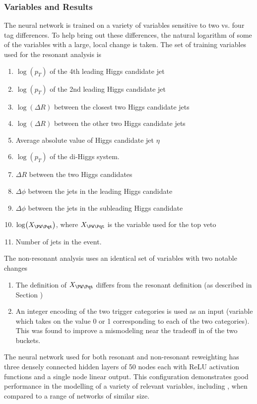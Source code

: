 \subsubsection{Variables and Results}
The neural network is trained on a variety of variables sensitive to two vs.
four tag differences. To help bring out these differences, the natural logarithm 
of some of the variables with a large, local change is taken. The 
set of training variables used for the resonant analysis is
\begin{enumerate}
	\item $\log(p_T)$ of the 4th leading Higgs candidate jet
	\item $\log(p_T)$ of the 2nd leading Higgs candidate jet
	\item $\log(\Delta R)$ between the closest two Higgs candidate jets
	\item $\log(\Delta R)$ between the other two Higgs candidate jets
	\item Average absolute value of Higgs candidate jet $\eta$
	\item $\log(p_T)$ of the di-Higgs system.
	\item $\Delta R$ between the two Higgs candidates
	\item $\Delta \phi$ between the jets in the leading Higgs candidate
	\item $\Delta \phi$ between the jets in the subleading Higgs candidate
	\item $\log(X_{\PW\Pqt})$, where $X_{\PW\Pqt}$ is the variable used for the top veto
	\item Number of jets in the event.
\end{enumerate}
The non-resonant analysis uses an identical set of variables with two notable changes
\begin{enumerate}
	\item The definition of $X_{\PW\Pqt}$ differs from the resonant definition (as described 
	in Section )
	\item An integer encoding of the two trigger categories is used as an input (variable which 
	takes on the value 0 or 1 corresponding to each of the two categories). This was found to improve
	a mismodeling near the tradeoff in \mhh of the two buckets.
\end{enumerate}

The neural network used for both resonant and non-resonant reweighting has three 
densely connected hidden layers of 50 nodes each with ReLU activation functions and a single node 
linear output. This configuration demonstrates good performance in the modelling 
of a variety of relevant variables, including \mhh, when compared to a 
range of networks of similar size.

